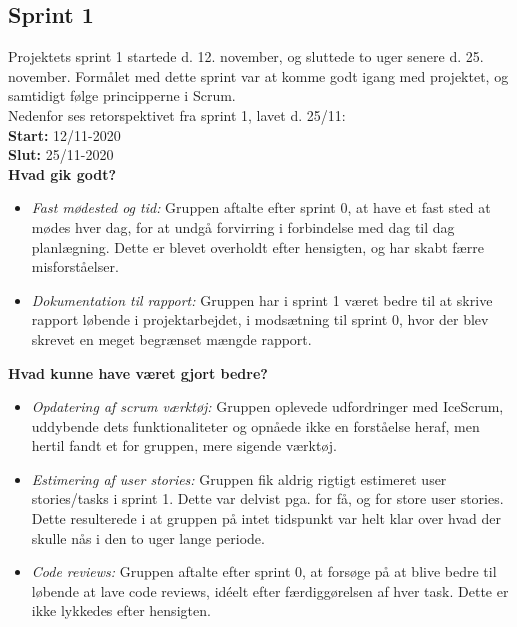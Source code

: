 \subsection{Sprint 1}
Projektets sprint 1 startede d. 12. november, og sluttede to uger senere d. 25. november.
Formålet med dette sprint var at komme godt igang med projektet, og samtidigt følge principperne i Scrum. \\
Nedenfor ses retorspektivet fra sprint 1, lavet d. 25/11: \\

\textbf{Start:} 12/11-2020 \\
\textbf{Slut:} 25/11-2020 \\

\textbf{Hvad gik godt?}
\begin{itemize}
    \item \textit{Fast mødested og tid:} Gruppen aftalte efter sprint 0, at have et fast sted at mødes hver dag, for at undgå 
    forvirring i forbindelse med dag til dag planlægning. Dette er blevet overholdt efter hensigten, og har skabt færre misforståelser. 
    \item \textit{Dokumentation til rapport:} Gruppen har i sprint 1 været bedre til at skrive rapport løbende i projektarbejdet, 
    i modsætning til sprint 0, hvor der blev skrevet en meget begrænset mængde rapport. 
\end{itemize}

\textbf{Hvad kunne have været gjort bedre?}
\begin{itemize}
    \item \textit{Opdatering af scrum værktøj:} Gruppen oplevede udfordringer med IceScrum, uddybende dets funktionaliteter 
    og opnåede ikke en forståelse heraf, men hertil fandt et for gruppen, mere sigende værktøj.  
    \item \textit{Estimering af user stories:} Gruppen fik aldrig rigtigt estimeret user stories/tasks i sprint 1. Dette var delvist pga. 
    for få, og for store user stories. Dette resulterede i at gruppen på intet tidspunkt var helt klar over hvad der skulle nås i den to uger lange periode. 
    \item \textit{Code reviews:} Gruppen aftalte efter sprint 0, at forsøge på at blive bedre til løbende at lave code reviews, idéelt efter færdiggørelsen
    af hver task. Dette er ikke lykkedes efter hensigten.
\end{itemize}

